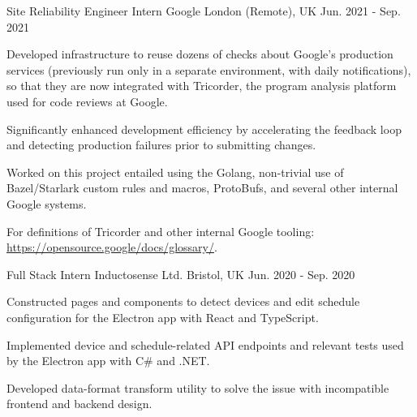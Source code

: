 \begin{cventries}
  \cventry
    {Site Reliability Engineer Intern} %
    {Google} %
    {London (Remote), UK} %
    {Jun. 2021 - Sep. 2021} %
    {
      \begin{cvitems} %
        \item {Developed infrastructure to reuse dozens of checks about Google’s production services (previously run only in a separate environment, with daily notifications), so that they are now integrated with Tricorder, the program analysis platform used for code reviews at Google.}
        \item {Significantly enhanced development efficiency by accelerating the feedback loop and detecting production failures prior to submitting changes.}
        \item {Worked on this project entailed using the Golang, non-trivial use of Bazel/Starlark custom rules and macros, ProtoBufs, and several other internal Google systems.}
        \item {For definitions of Tricorder and other internal Google tooling: \href{https://opensource.google/docs/glossary/}{https://opensource.google/docs/glossary/}.}
      \end{cvitems}
    }

  \cventry
    {Full Stack Intern} %
    {Inductosense Ltd.} %
    {Bristol, UK} %
    {Jun. 2020 - Sep. 2020} %
    {
      \begin{cvitems} %
        \item {Constructed pages and components to detect devices and edit schedule configuration for the Electron app with React and TypeScript.}
        \item {Implemented device and schedule-related API endpoints and relevant tests used by the Electron app with C\# and .NET.}
        \item {Developed data-format transform utility to solve the issue with incompatible frontend and backend design.}
      \end{cvitems}
    }


\end{cventries}
